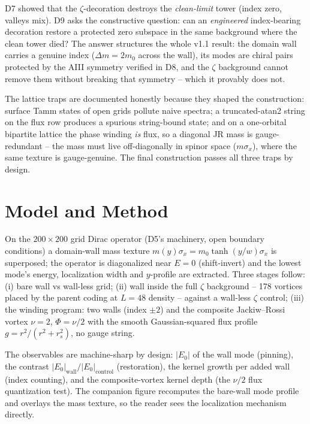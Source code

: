 \documentclass[11pt,a4paper]{article}
\begin{document}
D7 showed that the $\zeta$-decoration destroys the \emph{clean-limit} tower (index zero, valleys mix). D9 asks the constructive question: can an \emph{engineered} index-bearing decoration restore a protected zero subspace in the same background where the clean tower died? The answer structures the whole v1.1 result: the domain wall carries a genuine index ($\Delta m = 2m_0$ across the wall), its modes are chiral pairs protected by the AIII symmetry verified in D8, and the $\zeta$ background cannot remove them without breaking that symmetry -- which it provably does not.

The lattice traps are documented honestly because they shaped the construction: surface Tamm states of open grids pollute naive spectra; a truncated-atan2 string on the flux row produces a spurious string-bound state; and on a one-orbital bipartite lattice the phase winding \emph{is} flux, so a diagonal JR mass is gauge-redundant -- the mass must live off-diagonally in spinor space ($m\sigma_x$), where the same texture is gauge-genuine. The final construction passes all three traps by design.

\section{Model and Method}
On the $200\times200$ grid Dirac operator (D5's machinery, open boundary conditions) a domain-wall mass texture $m(y)\sigma_x = m_0\tanh(y/w)\sigma_x$ is superposed; the operator is diagonalized near $E = 0$ (shift-invert) and the lowest mode's energy, localization width and $y$-profile are extracted. Three stages follow: (i) bare wall vs wall-less grid; (ii) wall inside the full $\zeta$ background -- 178 vortices placed by the parent coding at $L = 48$ density -- against a wall-less $\zeta$ control; (iii) the winding program: two walls (index $\pm 2$) and the composite Jackiw--Rossi vortex $\nu = 2$, $\Phi = \nu/2$ with the smooth Gaussian-squared flux profile $g = r^2/(r^2 + r_s^2)$, no gauge string.

The observables are machine-sharp by design: $|E_0|$ of the wall mode (pinning), the contrast $|E_0|_{\mathrm{wall}} / |E_0|_{\mathrm{control}}$ (restoration), the kernel growth per added wall (index counting), and the composite-vortex kernel depth (the $\nu/2$ flux quantization test). The companion figure recomputes the bare-wall mode profile and overlays the mass texture, so the reader sees the localization mechanism directly.
\end{document}

